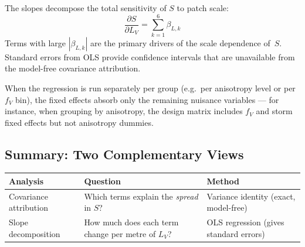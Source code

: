 \documentclass[11pt]{article}
\begin{document}
The slopes decompose the total sensitivity of $S$ to patch scale:
\begin{equation}\label{eq:slope-sum}
  \frac{\partial S}{\partial L_V}
  = \sum_{k=1}^{6} \beta_{L,k}
\end{equation}
Terms with large $|\beta_{L,k}|$ are the primary drivers of the
scale dependence of~$S$.  Standard errors from OLS provide
confidence intervals that are unavailable from the model-free
covariance attribution.

When the regression is run separately per group (e.g.\ per
anisotropy level or per $f_V$ bin), the fixed effects absorb only
the remaining nuisance variables --- for instance, when grouping by
anisotropy, the design matrix includes $f_V$ and storm fixed effects
but not anisotropy dummies.

\subsection{Summary: Two Complementary Views}

\begin{center}
\begin{tabular}{@{}lll@{}}
\toprule
Analysis & Question & Method \\
\midrule
Covariance attribution
  & Which terms explain the \emph{spread} in $S$?
  & Variance identity (exact, model-free) \\
Slope decomposition
  & How much does each term change per metre of $L_V$?
  & OLS regression (gives standard errors) \\
\bottomrule
\end{tabular}
\end{center}
\end{document}
